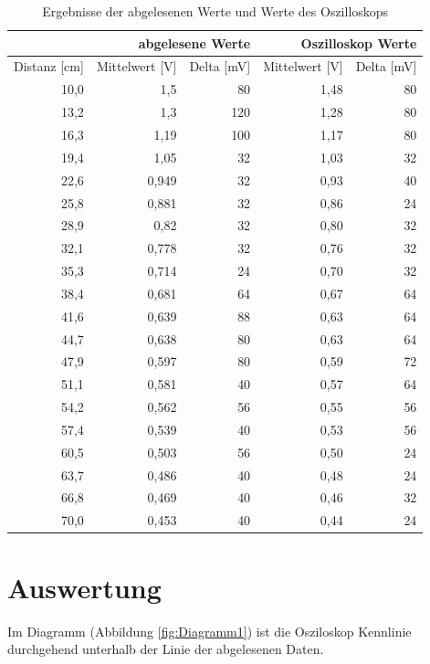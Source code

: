 \documentclass[12pt,oneside,a4paper]{report}
\begin{document}
\begin{table}[H]
\begin{tabular}{|r||r|r|r|r|}
\hline 
 & \multicolumn{2}{r|}{abgelesene Werte} & \multicolumn{2}{r|}{Oszilloskop Werte}\\ 
\hline 
Distanz [cm] & Mittelwert [V] & Delta [mV] & Mittelwert [V] & Delta [mV]\\ 
\hline 
10,0 & 1,5 & 80 & 1,48 & 80 \\ 
\hline 
13,2 & 1,3 & 120 & 1,28 & 80 \\ 
\hline 
16,3 & 1,19 & 100 & 1,17 & 80 \\ 
\hline
19,4 & 1,05 & 32 & 1,03 & 32 \\
\hline
22,6 & 0,949 & 32 & 0,93 & 40 \\
\hline
25,8 & 0,881 & 32 & 0,86 & 24\\
\hline
28,9 & 0,82 & 32 & 0,80 &  32\\
\hline
32,1 & 0,778 & 32 & 0,76 &  32\\
\hline
35,3 & 0,714 & 24 & 0,70 & 32 \\
\hline
38,4 & 0,681 & 64 & 0,67 &  64\\
\hline
41,6 & 0,639 & 88 & 0,63 &  64\\
\hline
44,7  & 0,638 & 80 & 0,63 &  64\\
\hline
47,9  & 0,597 & 80 & 0,59 &  72\\  
\hline
51,1 & 0,581 & 40 & 0,57 &  64\\ 
\hline
54,2 & 0,562 & 56 & 0,55 &  56\\ 
\hline
57,4 & 0,539 & 40 & 0,53 &  56\\ 
\hline
60,5 & 0,503 & 56 & 0,50 &  24\\ 
\hline
63,7 & 0,486 & 40 & 0,48 &  24\\ 
\hline
66,8 & 0,469 & 40 & 0,46 &  32\\ 
\hline
70,0 & 0,453 & 40 & 0,44 &  24\\ 
\hline
\end{tabular} 
\caption{Ergebnisse der abgelesenen Werte und Werte des Oszilloskops }
\label{tab:Aufg1Tabelle}
\end{table}

\section{Auswertung}
\label{chap:VERSUCH_1_AUSWERTUNG}
Im Diagramm (Abbildung \ref{fig:Diagramm1}) ist die Osziloskop Kennlinie durchgehend unterhalb der Linie der abgelesenen Daten.
\end{document}
